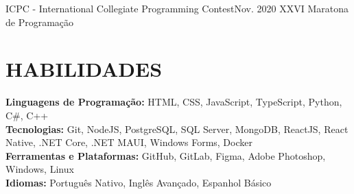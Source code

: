 \resumeSubheading
{ICPC - International Collegiate Programming Contest}{Nov. 2020}
{XXVI Maratona de Programação}{}
          
\resumeSubHeadingListEnd

\section{HABILIDADES}
\begin{itemize}[leftmargin=0in, label={}]
	\small{\item{
		\textbf{Linguagens de Programação:}
		{HTML, CSS, JavaScript, TypeScript, Python, C\#, C++}
		\vspace{2pt} \\
				
		\textbf{Tecnologias:}
		{Git, NodeJS, PostgreSQL, SQL Server, MongoDB, ReactJS, React Native, .NET Core, .NET MAUI, Windows Forms, Docker}
		\vspace{2pt} \\
						     
		\textbf{Ferramentas e Plataformas:}
		{GitHub, GitLab, Figma, Adobe Photoshop, Windows, Linux}
		\vspace{2pt} \\
						     
		\textbf{Idiomas:}
		{Português Nativo, Inglês Avançado, Espanhol Básico}
	}}
\end{itemize}